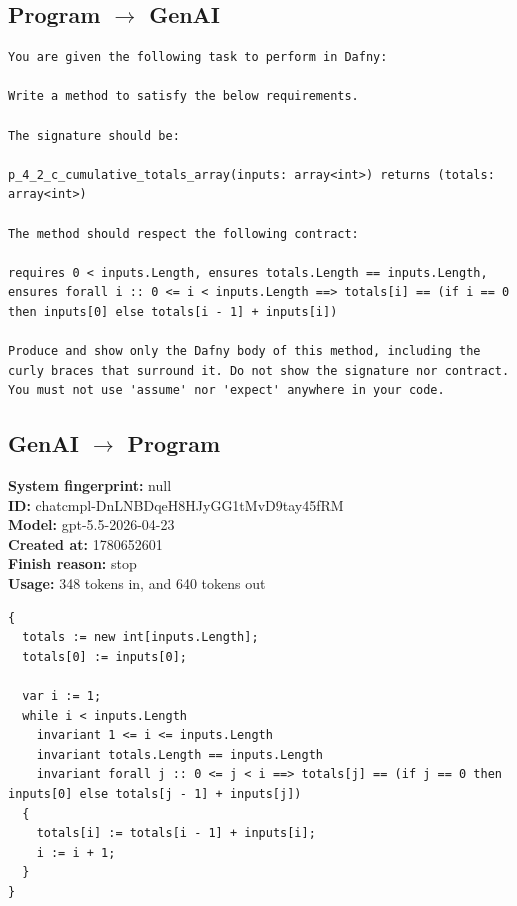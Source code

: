 \documentclass{article}
\begin{document}
\subsection*{Program $\rightarrow$ GenAI}
\begin{lstlisting}
You are given the following task to perform in Dafny:

Write a method to satisfy the below requirements.

The signature should be:

p_4_2_c_cumulative_totals_array(inputs: array<int>) returns (totals: array<int>)

The method should respect the following contract:

requires 0 < inputs.Length, ensures totals.Length == inputs.Length, ensures forall i :: 0 <= i < inputs.Length ==> totals[i] == (if i == 0 then inputs[0] else totals[i - 1] + inputs[i])

Produce and show only the Dafny body of this method, including the curly braces that surround it. Do not show the signature nor contract. You must not use 'assume' nor 'expect' anywhere in your code.
\end{lstlisting}
\subsection*{GenAI $\rightarrow$ Program}
\textbf{System fingerprint: }null
\\\textbf{ID: }chatcmpl-DnLNBDqeH8HJyGG1tMvD9tay45fRM
\\\textbf{Model: }gpt-5.5-2026-04-23
\\\textbf{Created at: }1780652601
\\\textbf{Finish reason: }stop
\\\textbf{Usage: }348 tokens in, and 640 tokens out
\begin{lstlisting}
{
  totals := new int[inputs.Length];
  totals[0] := inputs[0];

  var i := 1;
  while i < inputs.Length
    invariant 1 <= i <= inputs.Length
    invariant totals.Length == inputs.Length
    invariant forall j :: 0 <= j < i ==> totals[j] == (if j == 0 then inputs[0] else totals[j - 1] + inputs[j])
  {
    totals[i] := totals[i - 1] + inputs[i];
    i := i + 1;
  }
}
\end{lstlisting}
\end{document}
